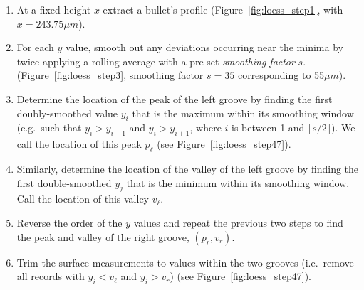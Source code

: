 \documentclass[aoas, preprint]{imsart}\usepackage[]{graphicx}\usepackage[]{color}
\begin{document}
\begin{enumerate}
    \item At a fixed height $x$ extract a bullet's profile (Figure~\ref{fig:loess_step1}, with $x = 243.75\mu m$).
    \item For each $y$ value, smooth out any deviations occurring near the minima by twice applying a rolling average with a pre-set \emph{smoothing factor} $s$. (Figure~\ref{fig:loess_step3}, smoothing factor $s = 35$ corresponding to 55$\mu m$).
    \item Determine the location of the peak of the left groove by finding the first doubly-smoothed value $y_i$ that is the maximum within its smoothing window (e.g.\ such that $y_i > y_{i - 1}$ and $y_i > y_{i + 1}$, where $i$ is between 1  and $\lfloor s/2 \rfloor$). We call the location of this peak $p_{\ell}$ (see Figure~\ref{fig:loess_step47}). 
    \item Similarly, determine the location of the valley of the left groove by finding the first double-smoothed $y_j$ that is the minimum within its smoothing window. Call the location of this valley $v_{\ell}$.
    \item Reverse the order of the $y$ values and repeat the previous two steps to find the peak and valley of the right groove, $(p_{r}, v_{r})$.
    \item Trim the surface measurements to values within the two grooves (i.e.\ remove all records with $y_i < v_{\ell}$ and $y_i > v_{r}$) (see Figure~\ref{fig:loess_step47}).
\end{enumerate}
\end{document}
